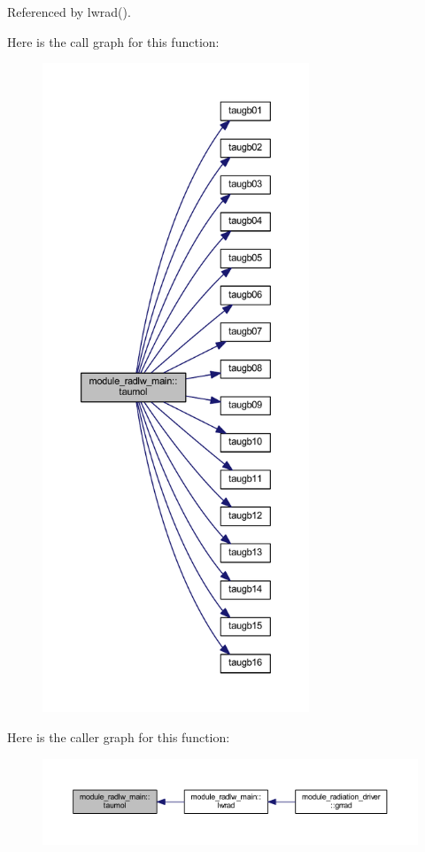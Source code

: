 Referenced by lwrad().



Here is the call graph for this function\+:\nopagebreak
\begin{figure}[H]
\begin{center}
\leavevmode
\includegraphics[height=550pt]{group__module__radlw__main_gac2fa8768f0911fed5343f643953c780d_cgraph}
\end{center}
\end{figure}




Here is the caller graph for this function\+:
\nopagebreak
\begin{figure}[H]
\begin{center}
\leavevmode
\includegraphics[width=350pt]{group__module__radlw__main_gac2fa8768f0911fed5343f643953c780d_icgraph}
\end{center}
\end{figure}




